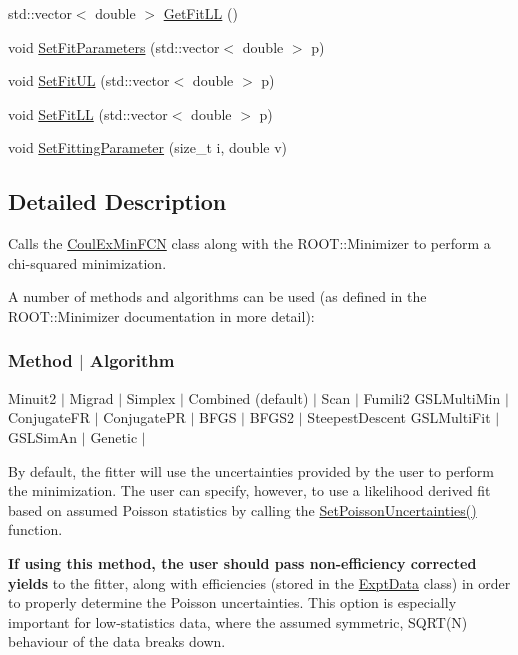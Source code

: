 \begin{DoxyCompactItemize}
\item 
std\-::vector$<$ double $>$ \hyperlink{classCoulExFitter_ae11e633a06fb57003ed0aefce142da39}{Get\-Fit\-L\-L} ()
\item 
void \hyperlink{classCoulExFitter_a51c86356259152d1a85a8c8a306cf211}{Set\-Fit\-Parameters} (std\-::vector$<$ double $>$ p)
\item 
void \hyperlink{classCoulExFitter_ab9fdcb9a745875306b9ae242cc735221}{Set\-Fit\-U\-L} (std\-::vector$<$ double $>$ p)
\item 
void \hyperlink{classCoulExFitter_a0d9efed6bd8fa2ddd77a3d0a4ce707bc}{Set\-Fit\-L\-L} (std\-::vector$<$ double $>$ p)
\item 
void \hyperlink{classCoulExFitter_a83475c9b135e7f3afdd55ce57ee307d7}{Set\-Fitting\-Parameter} (size\-\_\-t i, double v)
\end{DoxyCompactItemize}


\subsection{Detailed Description}
Calls the \hyperlink{classCoulExMinFCN}{Coul\-Ex\-Min\-F\-C\-N} class along with the R\-O\-O\-T\-::\-Minimizer to perform a chi-\/squared minimization. 

A number of methods and algorithms can be used (as defined in the R\-O\-O\-T\-::\-Minimizer documentation in more detail)\-:

\subsubsection*{Method $|$ Algorithm }

Minuit2 $|$ Migrad $|$ Simplex $|$ Combined (default) $|$ Scan $|$ Fumili2 G\-S\-L\-Multi\-Min $|$ Conjugate\-F\-R $|$ Conjugate\-P\-R $|$ B\-F\-G\-S $|$ B\-F\-G\-S2 $|$ Steepest\-Descent G\-S\-L\-Multi\-Fit $|$ G\-S\-L\-Sim\-An $|$ Genetic $|$

By default, the fitter will use the uncertainties provided by the user to perform the minimization. The user can specify, however, to use a likelihood derived fit based on assumed Poisson statistics by calling the \hyperlink{classCoulExFitter_a9e577fdf18978a59a8a3059522ba7355}{Set\-Poisson\-Uncertainties()} function.

{\bfseries If using this method, the user should pass non-\/efficiency corrected yields} to the fitter, along with efficiencies (stored in the \hyperlink{classExptData}{Expt\-Data} class) in order to properly determine the Poisson uncertainties. This option is especially important for low-\/statistics data, where the assumed symmetric, S\-Q\-R\-T(\-N) behaviour of the data breaks down.

